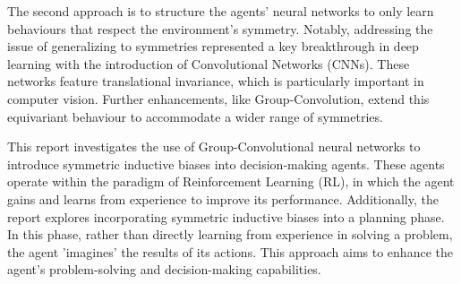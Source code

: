 The second approach is to structure the agents' neural networks to only learn behaviours that respect the environment's symmetry\cite{vanderpol2020mdp,wang2022so2, mondal2020group}. Notably, addressing the issue of generalizing to symmetries represented a key breakthrough in deep learning with the introduction of Convolutional Networks (CNNs)\cite{lecun1989backprop}. These networks feature translational invariance, which is particularly important in computer vision. Further enhancements, like Group-Convolution\cite{cohen2016group}, extend this equivariant behaviour to accommodate a wider range of symmetries.

This report investigates the use of Group-Convolutional neural networks to introduce symmetric inductive biases into decision-making agents. These agents operate within the paradigm of Reinforcement Learning (RL), in which the agent gains and learns from experience to improve its performance. Additionally, the report explores incorporating symmetric inductive biases into a planning phase. In this phase, rather than directly learning from experience in solving a problem, the agent 'imagines' the results of its actions. This approach aims to enhance the agent's problem-solving and decision-making capabilities.
